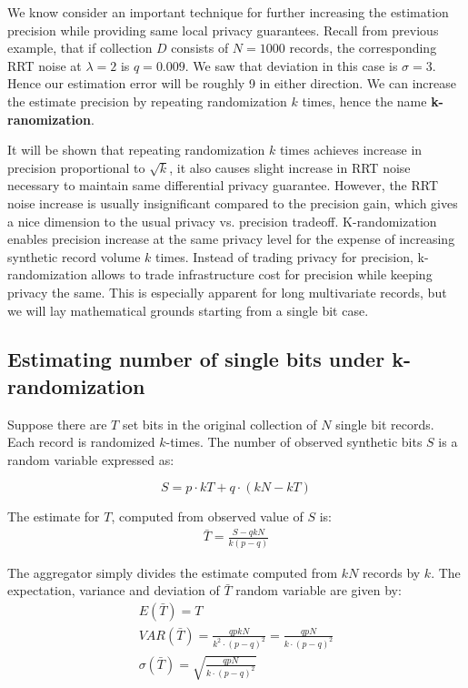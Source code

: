 \documentclass[11pt,draft]{article}
\begin{document}
We know consider an important technique for further increasing the estimation precision while providing same local privacy guarantees.  Recall from previous example, that if collection $D$ consists of $N=1000$ records, the corresponding RRT noise at $\lambda = 2$ is $q=0.009$.  We saw that deviation in this case is $\sigma=3$.  Hence our estimation error will be roughly 9 in either direction.   We can increase the estimate precision by  repeating randomization $k$ times, hence the name  \textbf{k-ranomization}.  

It will be shown that repeating randomization $k$ times achieves increase in precision proportional to $\sqrt{k}$,  it also causes slight increase in RRT noise necessary to maintain same differential privacy guarantee.  However, the RRT noise increase is usually insignificant compared to the precision gain, which gives a nice dimension to the usual privacy vs. precision tradeoff.  K-randomization enables precision increase at the same privacy level for the expense of increasing synthetic record volume $k$ times.  Instead of trading privacy for precision, k-randomization allows to trade infrastructure cost for precision while keeping privacy the same.  This is especially apparent for long multivariate records,  but we will lay mathematical grounds starting from a single bit case.

\subsection{Estimating number of single bits under k-randomization}

Suppose there are $T$ set bits in the original collection of $N$ single bit records. Each record is randomized $k$-times.  The number of observed synthetic bits $S$ is a random variable expressed as:

\[ S = p \cdot kT + q \cdot (kN-kT) \]

The estimate for $T$, computed from observed value of $S$ is:
\begin{align}
\bar{T} = \frac{S-qkN}{k(p-q)}
\end{align}

The aggregator simply divides the estimate computed from $kN$ records by $k$.  The expectation, variance and deviation of $\bar{T}$ random variable are given by:
\begin{align}
E(\bar{T}) = T\\
VAR(\bar{T}) = \frac{qpkN}{k^2 \cdot (p-q)^2} = \frac{qpN}{k\cdot (p-q)^2}\\
\sigma(\bar{T}) = \sqrt{\frac{qpN}{k \cdot (p-q)^2}}
\end{align}
\end{document}
